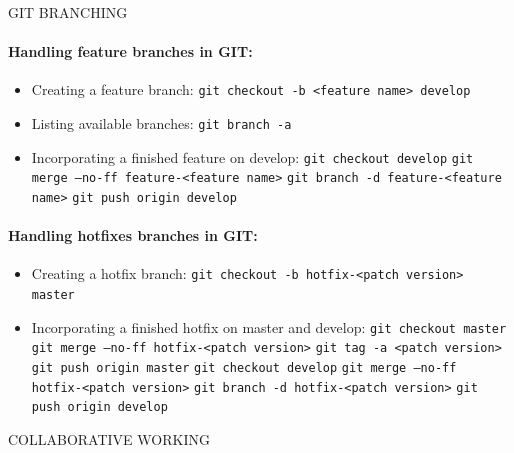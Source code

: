\documentclass[12pt,a4paper]{article}
\begin{document}
GIT BRANCHING
 
\paragraph{Handling feature branches in GIT:}
\begin{itemize}
\item Creating a feature branch:
\linebreak \texttt{git checkout -b <feature name> develop}
\item Listing available branches:
\linebreak \texttt{git branch -a}
\item Incorporating a finished feature on develop:
\linebreak \texttt{git checkout develop}
\linebreak \texttt{git merge --no-ff feature-<feature name>}
\linebreak \texttt{git branch -d  feature-<feature name>}
\linebreak \texttt{git push origin develop}
\end{itemize}


\pagebreak
\paragraph{Handling hotfixes branches in GIT:}
\begin{itemize}
\item Creating a hotfix branch:
\linebreak \texttt{git checkout -b hotfix-<patch version> master}
\item Incorporating a finished hotfix on master and develop:
\linebreak \texttt{git checkout master}
\linebreak \texttt{git merge --no-ff hotfix-<patch version>}
\linebreak \texttt{git tag -a <patch version>}
\linebreak \texttt{git push origin master}
\linebreak \texttt{git checkout develop}
\linebreak \texttt{git merge --no-ff hotfix-<patch version>}
\linebreak \texttt{git branch -d  hotfix-<patch version>}
\linebreak \texttt{git push origin develop}
\end{itemize}


COLLABORATIVE WORKING
\end{document}
